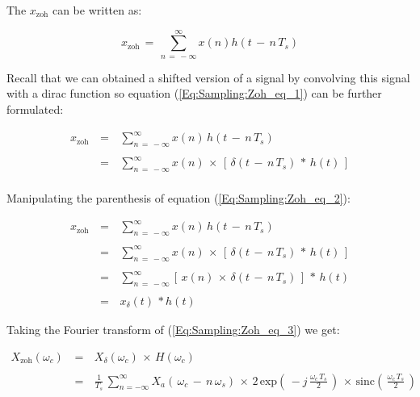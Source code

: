 \documentclass[12pt,a4paper]{book}
\begin{document}
The $x_{\text{zoh}}$ can be written as:

\begin{equation}
x_{\text{zoh}} \, = \, \displaystyle\sum\limits_{n \, = \, -\infty}^{\infty} x(n) h\left(	t \, - \, n\,T_s \right)
\label{Eq:Sampling:Zoh_eq_1}
\end{equation}

Recall that we can obtained a shifted version of a signal by convolving this signal with a dirac function so equation (\ref{Eq:Sampling:Zoh_eq_1}) can be further formulated:

\begin{equation}
\begin{array}{rcl}
x_{\text{zoh}} \, &=& \, \displaystyle\sum\limits_{n \, = \, -\infty}^{\infty} x(n) \, h\left(	t \, - \, n\,T_s \right) \\ \\		
&=& \, \displaystyle\sum\limits_{n \, = \, -\infty}^{\infty} x(n) \, \times \, \left[ \, \delta \left(	t \, - \, n\,T_s \right) \, * \, h(t) \, \right] \\ 
\end{array}
\label{Eq:Sampling:Zoh_eq_2}
\end{equation}


Manipulating the parenthesis of equation (\ref{Eq:Sampling:Zoh_eq_2}):

\begin{equation}
\begin{array}{rcl}
x_{\text{zoh}} \, &=& \, \displaystyle\sum\limits_{n \, = \, -\infty}^{\infty} x(n) \, h\left(	t \, - \, n\,T_s \right) \\ \\		
&=& \, \displaystyle\sum\limits_{n \, = \, -\infty}^{\infty} x(n) \, \times \, \left[ \, \delta \left(	t \, - \, n\,T_s \right) \, * \, h(t) \, \right] \\ \\
&=& \, \displaystyle\sum\limits_{n \, = \, -\infty}^{\infty} \left[\, x(n) \, \times  \, \delta \left(	t \, - \, n\,T_s \right) \, \right] \, * \, h(t)   \\ \\
&=& \,  x_{\delta}(t) \, * h(t)
\end{array}
\label{Eq:Sampling:Zoh_eq_3}
\end{equation}


Taking the Fourier transform of (\ref{Eq:Sampling:Zoh_eq_3}) we get:

\begin{equation}
\begin{array}{rcl}
X_{\text{zoh}}(\omega_c) \, &=& \, X_{\delta}(\omega_c) \, \times \, H(\omega_c) \\ \\
			 &=& \, \displaystyle\frac{1}{T_s} \, \displaystyle\sum\limits_{n  =  -\infty}^{\infty} X_a \left( \, \omega_c \, - \,  n \, \omega_s \right) \, \times \, 2 \, \text{exp}\left( \, -j \, \displaystyle\frac{\omega_c \, T_s}{2} \, \right) \, \times \, \text{sinc}\left(\, \displaystyle\frac{\omega_c \, T_s}{2} \,\right) 
\end{array}
\end{equation}
\end{document}
